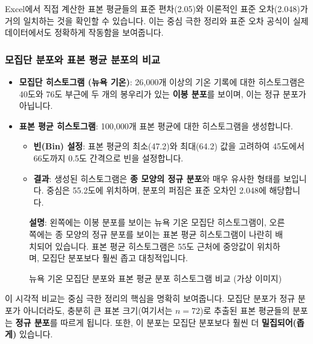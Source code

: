 \documentclass[11pt,a4paper]{article}
\theoremstyle{definition}
\begin{document}
\begin{summarybox}
Excel에서 직접 계산한 표본 평균들의 표준 편차(2.05)와 이론적인 표준 오차(2.048)가 거의 일치하는 것을 확인할 수 있습니다. 이는 중심 극한 정리와 표준 오차 공식이 실제 데이터에서도 정확하게 작동함을 보여줍니다.
\end{summarybox}

\subsubsection*{모집단 분포와 표본 평균 분포의 비교}

\begin{itemize}
    \item \textbf{모집단 히스토그램 (뉴욕 기온)}: 26,000개 이상의 기온 기록에 대한 히스토그램은 40도와 76도 부근에 두 개의 봉우리가 있는 \textbf{이봉 분포}를 보이며, 이는 정규 분포가 아닙니다.
    \item \textbf{표본 평균 히스토그램}: 100,000개 표본 평균에 대한 히스토그램을 생성합니다.
    \begin{itemize}
        \item \textbf{빈(Bin) 설정}: 표본 평균의 최소(47.2)와 최대(64.2) 값을 고려하여 45도에서 66도까지 0.5도 간격으로 빈을 설정합니다.
        \item \textbf{결과}: 생성된 히스토그램은 \textbf{종 모양의 정규 분포}와 매우 유사한 형태를 보입니다. 중심은 55.2도에 위치하며, 분포의 퍼짐은 표준 오차인 2.048에 해당합니다.
    \end{itemize}
\end{itemize}

\begin{figure}[h!]
    \centering
    \caption{뉴욕 기온 모집단 분포와 표본 평균 분포 히스토그램 비교 (가상 이미지)}
    \label{fig:excel_hist_comp}
    \textbf{설명}: 왼쪽에는 이봉 분포를 보이는 뉴욕 기온 모집단 히스토그램이, 오른쪽에는 종 모양의 정규 분포를 보이는 표본 평균 히스토그램이 나란히 배치되어 있습니다. 표본 평균 히스토그램은 55도 근처에 중앙값이 위치하며, 모집단 분포보다 훨씬 좁고 대칭적입니다.
\end{figure}

\begin{summarybox}
이 시각적 비교는 중심 극한 정리의 핵심을 명확히 보여줍니다. 모집단 분포가 정규 분포가 아니더라도, 충분히 큰 표본 크기(여기서는 $n=72$)로 추출된 표본 평균들의 분포는 \textbf{정규 분포}를 따르게 됩니다. 또한, 이 분포는 모집단 분포보다 훨씬 더 \textbf{밀집되어(좁게)} 있습니다.
\end{summarybox}
\end{document}
